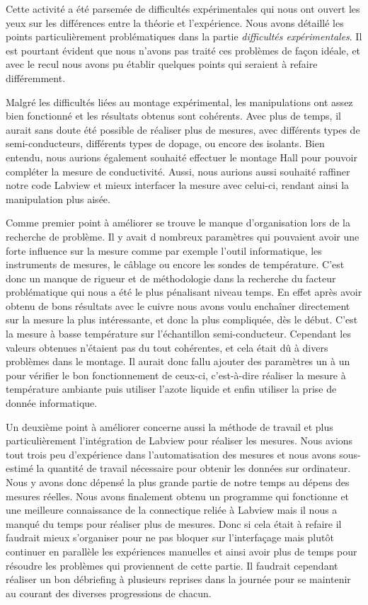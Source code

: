 Cette activité a été parsemée de difficultés expérimentales qui nous ont ouvert les yeux sur les différences entre la théorie et l'expérience. Nous avons détaillé les points particulièrement problématiques dans la partie \emph{difficultés expérimentales}. Il est pourtant évident que nous n'avons pas traité ces problèmes de façon idéale, et avec le recul nous avons pu établir quelques points qui seraient à refaire différemment.

\bigskip

Malgré les difficultés liées au montage expérimental, les manipulations ont assez bien fonctionné et les résultats obtenus sont cohérents.
Avec plus de temps, il aurait sans doute été possible de réaliser plus de mesures, avec différents types de semi-conducteurs, différents types de dopage, ou encore des isolants.
Bien entendu, nous aurions également souhaité effectuer le montage Hall pour pouvoir compléter la mesure de conductivité.
Aussi, nous aurions aussi souhaité raffiner notre code Labview et mieux interfacer la mesure avec celui-ci, rendant ainsi la manipulation plus aisée.

\bigskip

Comme premier point à améliorer se trouve le manque d'organisation lors de la recherche de problème. Il y avait 
d nombreux paramètres qui pouvaient avoir une forte influence sur la mesure comme par exemple l'outil informatique, 
les instruments de mesures, le câblage ou encore les sondes de température. C'est donc un manque de rigueur et de 
méthodologie dans la recherche du facteur problématique qui nous a été le plus pénalisant niveau temps. 
En effet après avoir obtenu de bons résultats avec le cuivre nous avons voulu enchaîner directement sur la mesure la 
plus intéressante, et donc la plus compliquée, dès le début. C'est la mesure à basse température sur l'échantillon 
semi-conducteur. Cependant les valeurs obtenues n'étaient pas du tout cohérentes, et cela était dû à divers problèmes 
dans le montage. Il aurait donc fallu ajouter des paramètres un à un pour vérifier le bon fonctionnement de ceux-ci, 
c'est-à-dire réaliser la mesure à température ambiante puis utiliser l'azote liquide et enfin utiliser la prise de donnée informatique. 

\bigskip

Un deuxième point à améliorer concerne aussi la méthode de travail et plus particulièrement l'intégration de Labview 
pour réaliser les mesures. Nous avions tout trois peu d'expérience dans l'automatisation des mesures et nous avons 
sous-estimé la quantité de travail nécessaire pour obtenir les données sur ordinateur. Nous y avons donc dépensé la 
plus grande partie de notre temps au dépens des mesures réelles. Nous avons finalement obtenu un programme qui 
fonctionne et une meilleure connaissance de la connectique reliée à Labview mais il nous a manqué du temps pour 
réaliser plus de mesures. Donc si cela était à refaire il faudrait mieux s'organiser pour ne pas bloquer sur 
l'interfaçage mais plutôt continuer en parallèle les expériences manuelles et ainsi avoir plus de temps pour résoudre les problèmes qui proviennent de cette partie. Il faudrait cependant réaliser un bon débriefing à plusieurs reprises dans la journée pour se maintenir au courant des diverses progressions de chacun. 

